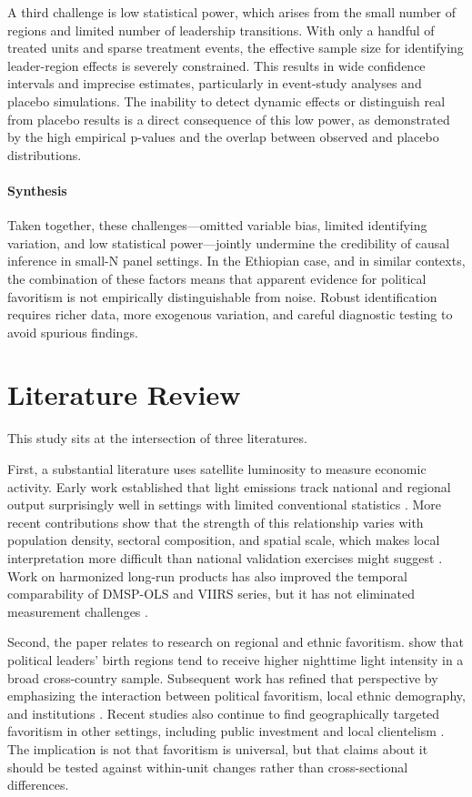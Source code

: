 \documentclass[12pt,a4paper]{article}
\begin{document}
A third challenge is low statistical power, which arises from the small number of regions and limited number of leadership transitions. With only a handful of treated units and sparse treatment events, the effective sample size for identifying leader-region effects is severely constrained. This results in wide confidence intervals and imprecise estimates, particularly in event-study analyses and placebo simulations. The inability to detect dynamic effects or distinguish real from placebo results is a direct consequence of this low power, as demonstrated by the high empirical p-values and the overlap between observed and placebo distributions.

\paragraph{Synthesis}

Taken together, these challenges—omitted variable bias, limited identifying variation, and low statistical power—jointly undermine the credibility of causal inference in small-N panel settings. In the Ethiopian case, and in similar contexts, the combination of these factors means that apparent evidence for political favoritism is not empirically distinguishable from noise. Robust identification requires richer data, more exogenous variation, and careful diagnostic testing to avoid spurious findings.

\section{Literature Review}
This study sits at the intersection of three literatures.

First, a substantial literature uses satellite luminosity to measure economic activity. Early work established that light emissions track national and regional output surprisingly well in settings with limited conventional statistics \citep{Chen2011,Henderson2012}. More recent contributions show that the strength of this relationship varies with population density, sectoral composition, and spatial scale, which makes local interpretation more difficult than national validation exercises might suggest \citep{Bluhm2022,Gibson2021}. Work on harmonized long-run products has also improved the temporal comparability of DMSP-OLS and VIIRS series, but it has not eliminated measurement challenges \citep{Li2023,Gibson2024}.

Second, the paper relates to research on regional and ethnic favoritism. \citet{Hodler2014} show that political leaders' birth regions tend to receive higher nighttime light intensity in a broad cross-country sample. Subsequent work has refined that perspective by emphasizing the interaction between political favoritism, local ethnic demography, and institutions \citep{BeiserMcGrath2021}. Recent studies also continue to find geographically targeted favoritism in other settings, including public investment and local clientelism \citep{Onana2024,Cruzatti2024}. The implication is not that favoritism is universal, but that claims about it should be tested against within-unit changes rather than cross-sectional differences.
\end{document}
